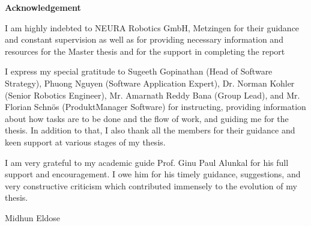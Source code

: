 \documentclass[12pt]{article}
\begin{document}
\newpage
\tableofcontents
\newpage
\listoffigures
{}
\newpage
\listoftables
{}
\newpage
\raggedright
\newpage
\raggedright
{}
\begin{center}
    \textbf{Acknowledgement}
\end{center}
    \raggedright

    I am highly indebted to NEURA Robotics GmbH, Metzingen for their guidance and constant supervision as well as for providing necessary information and resources for the Master thesis and for the support in completing the report

    \vspace{1cm}
    
    I express my special gratitude to Sugeeth Gopinathan (Head of Software Strategy), Phuong Nguyen (Software Application Expert), Dr. Norman Kohler (Senior Robotics Engineer), Mr. Amarnath Reddy Bana (Group Lead), and Mr. Florian Schnös (ProduktManager Software) for instructing, providing information about how tasks are to be done and the flow of work, and guiding me for the thesis. In addition to that, I also thank all the members for their guidance and keen support at various stages of my thesis.

    \vspace{1cm}

    I am very grateful to my academic guide Prof. Ginu Paul Alunkal for his full support and encouragement. I owe him for his timely guidance, suggestions, and very constructive criticism which contributed immensely to the evolution of my thesis.
    
    \vspace{1.5 cm}
    
    \raggedleft
    Midhun Eldose
\end{document}

